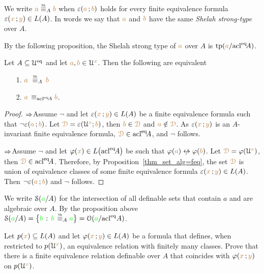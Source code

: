 \begin{definition}\label{def_Sh_strong_type}
We write \emph{${\mr a}\stackrel{\smash{\scalebox{.5}{\rm Sh}}}{\equiv}_A{\mr b}$} when $\varepsilon({\color{brown} a}\,;{\color{brown} b})$ holds for every finite equivalence formula $\varepsilon({\color{brown} x}\,;{\color{brown} y})\in L(A)$.
In words we say that ${\color{brown} a}$ and ${\color{brown} b}$ have the same \emph{Shelah strong-type\/} over $A$.
\end{definition}

By the following proposition, the Shelah strong type of ${\color{brown} a}$ over $A$ is ${\rm tp}({\color{brown} a}/{\rm acl}^{{\rm eq}}\!A)$.


\begin{proposition}\label{prop_Shelah_strong_types}
Let $A\subseteq\EuScript U^{{\rm eq}}$ and let ${\color{brown} a},{\color{brown} b}\in\EuScript U^{\color{brown} x}$.
Then the following are equivalent\nobreak
\begin{itemize}
\item[1.]  ${\mr a}\ \equivSh_A\, {\mr b}$
\item[2.]  ${\color{brown} a}\,\equiv_{{\rm acl}^{{\rm eq}}\! A}{\color{brown} b}$.
\end{itemize} 
\end{proposition}
\begin{proof}
$\Rightarrow$\quad Assume $\neg$ and let $\varepsilon({\color{brown} x}\,;{\color{brown} y})\in L(A)$ be a finite equivalence formula such that $\neg\varepsilon({\color{brown} a}\,;{\color{brown} b})$.
Let ${\color{brown}\EuScript D}=\varepsilon(\EuScript U^{\color{brown} x};{\color{brown} b})$, then  ${\color{brown} b}\in{\color{brown}\EuScript D}$ and ${\color{brown} a}\notin{\color{brown}\EuScript D}$.
As $\varepsilon({\color{brown} x}\,;{\color{brown} y})$ is an $A$-invariant finite equivalence formula, ${\color{brown}\EuScript D}\in{\rm acl}^{{\rm eq}}\!A$, and $\neg$ follows.


$\Rightarrow$\quad Assume $\neg$ and let $\varphi({\color{brown} x})\in L\big({\rm acl}^{{\rm eq}}\!A\big)$ be  such that $\phi({\mr a})\niff\phi({\mr b})$.
Let ${\color{brown}\EuScript D}=\varphi(\EuScript U^{\color{brown} x})$, then ${\color{brown}\EuScript D}\in{\rm acl}^{{\rm eq}}\!A$.
Therefore, by Proposition~\ref{thm_set_alg=feq}, the set ${\color{brown}\EuScript D}$ is union of equivalence classes of some finite equivalence formula $\varepsilon({\color{brown} x}\,;{\color{brown} y})\in L(A)$.
Then $\neg\varepsilon({\color{brown} a}\,;{\color{brown} b})$ and $\neg$ follows.
\end{proof}

\noindent\llap{\textcolor{red}{\Large\warning}\kern1.5ex}We write \emph{$\EuScript S({\color{green} a}/A)$\/} for the intersection of all definable sets that contain $a$ and are algebraic over $A$.
By the proposition above $\S({\gr a}/A)=\big\{{\gr b}\,:\,{\gr b}\,\equivSh_A {\gr a}\big\}=\Orbit({\gr a}/\acl^\eq A)$.


\begin{exercise}
Let $p({\color{brown} x})\subseteq L(A)$ and let $\varphi({\color{brown} x}\,;{\color{brown} y})\in L(A)$ be a formula that defines, when restricted to $p(\EuScript U^{\color{brown} x})$, an equivalence relation with finitely many classes.
Prove that there is a finite equivalence relation definable over $A$ that coincides with $\varphi({\color{brown} x}\,;{\color{brown} y})$ on $p(\EuScript U^{\color{brown} x})$.
\end{exercise}

